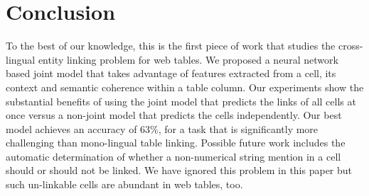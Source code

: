 \section{Conclusion}

To the best of our knowledge, this is the first piece of work that studies
the cross-lingual entity linking problem for web tables. We proposed a neural
network based joint model that takes advantage of features extracted from
a cell, its context and semantic coherence within a table column. 
Our experiments show the substantial benefits of using the 
joint model that predicts the links of all cells at once 
versus a non-joint model that predicts the cells independently. Our best
model achieves an accuracy of 63\%, for a task that is significantly more
challenging than mono-lingual table linking. Possible future work includes
the automatic determination of whether a non-numerical string mention in 
a cell should or should not be linked. We have ignored this problem in this
paper but such un-linkable cells are abundant in web tables, too.
